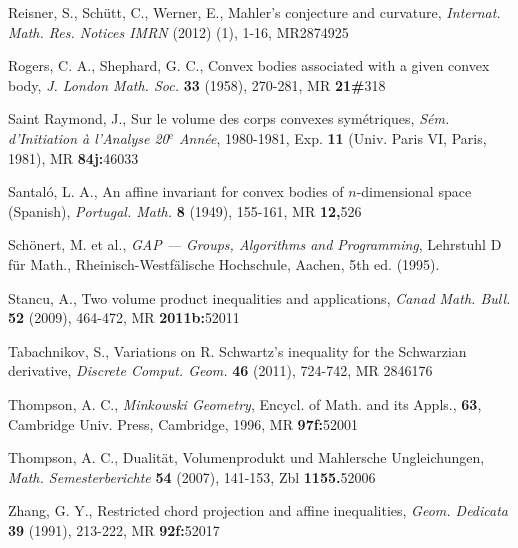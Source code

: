 \documentclass[12pt]{article}
\begin{document}
\begin{thebibliography}{999999}
Reisner, S., Sch\"utt, C., Werner, E.,
Mahler's conjecture and curvature,
{\it{Internat. Math. Res. Notices IMRN}} (2012) (1), 1-16, 
MR2874925

Rogers,  C. A., Shephard, G. C.,
Convex bodies associated with a given convex body,
{\it{J. London Math. Soc.}} {\bf{33}} (1958), 270-281, MR {\bf{21\#}}{\rm{318}}

Saint Raymond, J.,
Sur le volume des corps convexes sym\'etriques,
{\it{S\'em. d'Initiation \`a l'Analyse 20$^{\text{e}}$ Ann\'ee}}, 
1980-1981, Exp. {\bf{11}} (Univ. Paris VI, Paris, 1981),
MR {\bf{84j:}}{\rm{46033}}

Santal\'o, L. A.,
An affine invariant for convex bodies of $n$-dimensional space (Spanish), 
{\it{Portugal. Math.}} {\bf{8}} (1949), 155-161, MR {\bf{12,}}{\rm{526}}

Sch\"onert, M. et al., 
{\it{GAP --- Groups, Algorithms and Programming}}, 
Lehrstuhl D f\"ur Math., Rheinisch-Westf\"alische Hochschule,
Aachen, 5th ed. (1995). 

Stancu, A.,
Two volume product inequalities and applications,
{\it{Canad Math. Bull.}} {\bf{52}} (2009), 464-472, 
MR {\bf{2011b:}}52011 

Tabachnikov, S.,
Variations on R. Schwartz's inequality for the Schwarzian derivative,
{\it{Discrete Comput. Geom.}} {\bf{46}} (2011), 724-742, MR 2846176

Thompson, A. C.,
{\it{Minkowski Geometry}}, Encycl. of Math. and its Appls., {\bf{63}},
Cambridge Univ. Press, Cambridge, 1996,
MR {\bf{97f:}}{\rm{52001}}

Thompson, A. C., 
Dualit\"at, Volumenprodukt und Mahlersche Ungleichungen,
{\it{Math. Semesterberichte}} {\bf{54}} (2007), 141-153, Zbl 
{\bf{1155.}}{\rm{52006}}

Zhang, G. Y.,
Restricted chord projection and affine inequalities,
{\it{Geom. Dedicata}} {\bf{39}} (1991), 213-222, MR {\bf{92f:}}{\rm{52017}}

\end{thebibliography}
\end{document}
